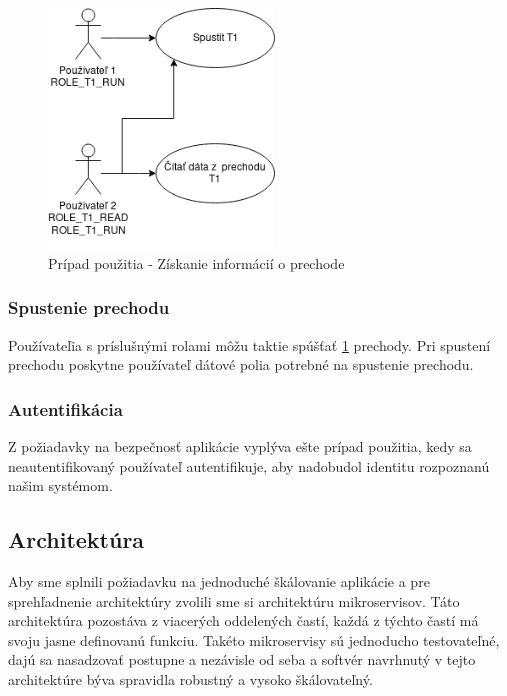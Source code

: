 \begin{figure}[!htbp]
	\centering
	\includegraphics[width=6cm]{img/dp_usecase_2_read_run.png}
	\caption{Prípad použitia - Získanie informácií o prechode}
	\label{usecase2}
\end{figure} 

\subsubsection{Spustenie prechodu}
Používateľia s príslušnými rolami môžu taktie spúšťať \ref{usecase2} prechody. Pri spustení prechodu poskytne používateľ dátové polia potrebné na spustenie prechodu. 

\subsubsection{Autentifikácia}
Z požiadavky na bezpečnosť aplikácie vyplýva ešte prípad použitia, kedy sa neautentifikovaný používateľ autentifikuje, aby nadobudol identitu rozpoznanú našim systémom. 



\subsection{Architektúra} 

Aby sme splnili požiadavku na jednoduché škálovanie aplikácie a pre sprehľadnenie architektúry zvolili sme si architektúru mikroservisov. Táto architektúra pozostáva z viacerých oddelených častí, každá z týchto častí má svoju jasne definovanú funkciu. Takéto mikroservisy sú jednoducho testovateľné, dajú sa nasadzovať postupne a nezávisle od seba a softvér navrhnutý v tejto architektúre býva spravidla robustný a vysoko škálovateľný.  

